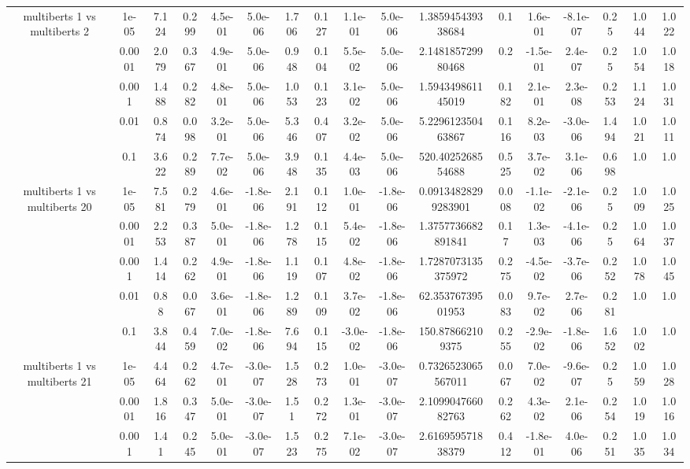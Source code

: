 \begin{tabular}{|c|c|c|c|c|c|c|c|c|c|c|c|c|c|c|c|c|}
\hline
\multirow{5}{*}{multiberts 1 vs multiberts 2} & 1e-05 & 7.124 & 0.299 & 4.5e-01 & 5.0e-06 & 1.706 & 0.127 & 1.1e-01 & 5.0e-06 & 1.385945439338684 & 0.1 & 1.6e-01 & -8.1e-07 & 0.25 & 1.044 & 1.022 \\
 & 0.0001 & 2.079 & 0.367 & 4.9e-01 & 5.0e-06 & 0.948 & 0.104 & 5.5e-02 & 5.0e-06 & 2.148185729980468 & 0.2 & -1.5e-01 & 2.4e-07 & 0.25 & 1.054 & 1.018 \\
 & 0.001 & 1.488 & 0.282 & 4.8e-01 & 5.0e-06 & 1.053 & 0.123 & 3.1e-02 & 5.0e-06 & 1.594349861145019 & 0.182 & 2.1e-01 & 2.3e-08 & 0.253 & 1.124 & 1.031 \\
 & 0.01 & 0.874 & 0.098 & 3.2e-01 & 5.0e-06 & 5.346 & 0.407 & 3.2e-02 & 5.0e-06 & 5.229612350463867 & 0.116 & 8.2e-03 & -3.0e-06 & 1.494 & 1.021 & 1.011 \\
 & 0.1 & 3.622 & 0.289 & 7.7e-02 & 5.0e-06 & 3.948 & 0.135 & 4.4e-03 & 5.0e-06 & 520.4025268554688 & 0.525 & 3.7e-02 & 3.1e-06 & 0.698 & 1.0 & 1.0 \\
\hline
\multirow{5}{*}{multiberts 1 vs multiberts 20} & 1e-05 & 7.581 & 0.279 & 4.6e-01 & -1.8e-06 & 2.191 & 0.112 & 1.0e-01 & -1.8e-06 & 0.09134828299283901 & 0.008 & -1.1e-02 & -2.1e-06 & 0.25 & 1.009 & 1.025 \\
 & 0.0001 & 2.253 & 0.387 & 5.0e-01 & -1.8e-06 & 1.278 & 0.115 & 5.4e-02 & -1.8e-06 & 1.3757736682891841 & 0.17 & 1.3e-03 & -4.1e-06 & 0.25 & 1.064 & 1.037 \\
 & 0.001 & 1.414 & 0.262 & 4.9e-01 & -1.8e-06 & 1.119 & 0.107 & 4.8e-02 & -1.8e-06 & 1.7287073135375972 & 0.275 & -4.5e-02 & -3.7e-06 & 0.252 & 1.078 & 1.045 \\
 & 0.01 & 0.88 & 0.067 & 3.6e-01 & -1.8e-06 & 1.289 & 0.109 & 3.7e-02 & -1.8e-06 & 62.35376739501953 & 0.083 & 9.7e-02 & 2.7e-06 & 0.281 & 1.0 & 1.0 \\
 & 0.1 & 3.844 & 0.459 & 7.0e-02 & -1.8e-06 & 7.694 & 0.115 & -3.0e-02 & -1.8e-06 & 150.878662109375 & 0.255 & -2.9e-02 & -1.8e-06 & 1.652 & 1.002 & 1.0 \\
\hline
\multirow{5}{*}{multiberts 1 vs multiberts 21} & 1e-05 & 4.464 & 0.262 & 4.7e-01 & -3.0e-07 & 1.528 & 0.273 & 1.0e-01 & -3.0e-07 & 0.7326523065567011 & 0.067 & 7.0e-02 & -9.6e-07 & 0.25 & 1.059 & 1.028 \\
 & 0.0001 & 1.816 & 0.347 & 5.0e-01 & -3.0e-07 & 1.51 & 0.272 & 1.3e-01 & -3.0e-07 & 2.109904766082763 & 0.262 & 4.3e-02 & 2.1e-06 & 0.254 & 1.019 & 1.016 \\
 & 0.001 & 1.41 & 0.245 & 5.0e-01 & -3.0e-07 & 1.523 & 0.275 & 7.1e-02 & -3.0e-07 & 2.616959571838379 & 0.412 & -1.8e-01 & 4.0e-06 & 0.251 & 1.035 & 1.034 \\

\end{tabular}
